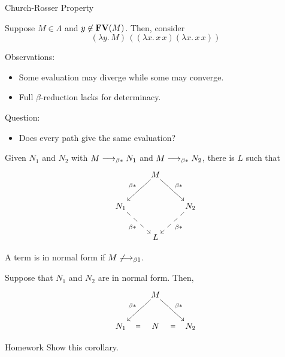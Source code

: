 \begin{frame}[allowframebreaks]{Church-Rosser Property}
  \begin{example}
    Suppose $M \in \Lambda$ and $y \not\in \mathbf{FV}(M)$. 
    Then, consider 
    \[
      (\lambda y.\, M)\, ((\lambda x.\, x\,x)(\lambda x.\, x\, x))
    \]
  \end{example}
  Observations:
  \begin{itemize}
    \item Some evaluation may diverge while some may converge.
    \item Full $\beta$-reduction lacks for determinacy. 
  \end{itemize}
  Question:
  \begin{itemize}
    \item Does every path give the same evaluation?
  \end{itemize}

  \framebreak

\begin{theorem}
  Given $N_1$ and $N_2$ with $M \longrightarrow_{\beta*} N_1$ and $M\longrightarrow_{\beta*} N_2$, there is $L$
  such that
  \[
    \xymatrix{
      & M \ar[rd]^{\beta*} \ar[ld]_{\beta*} \\
      N_1 \ar@{-->}[rd]_{\beta*} & & N_2 \ar@{-->}[ld]^{\beta*} \\
      & L
    }
  \]
\end{theorem}
\framebreak
A term is in normal form if $M \not\longrightarrow_{\beta1}$. 

\begin{corollary}\label{coro:uniqueness-normal}
  Suppose that $N_1$ and $N_2$ are in normal form. Then, 
  \[
    \xymatrix{
      & M \ar[rd]^{\beta*} \ar[ld]_{\beta*} \\
      N_1 \ar@{}[r]|{=} & N & N_2 \ar@{}[l]|{=} \\
    }
  \]
\end{corollary}

\begin{block}{Homework}
  Show this corollary.
\end{block}


\end{frame}
